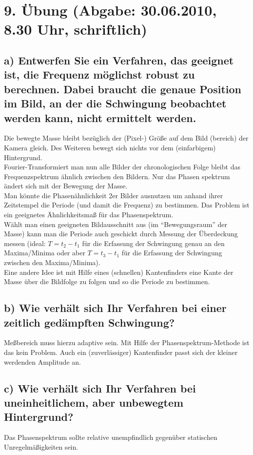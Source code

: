 \section*{9. \"Ubung (Abgabe: 30.06.2010, 8.30 Uhr, schriftlich)}

\subsection*{a) Entwerfen Sie ein Verfahren, das geeignet ist, die Frequenz m\"oglichst robust zu berechnen. Dabei braucht die genaue Position im Bild, an der die Schwingung beobachtet werden kann, nicht ermittelt werden.}
Die bewegte Masse bleibt bez\"uglich der (Pixel-) Gr\"o{\ss}e auf dem Bild (bereich) der Kamera gleich. Des Weiteren bewegt sich nichts vor dem (einfarbigem) Hintergrund. \\
Fourier-Transformiert man nun alle Bilder der chronologischen Folge bleibt das Frequenzspektrum \"ahnlich zwischen den Bildern.
Nur das Phasen spektrum \"andert sich mit der Bewegung der Masse. \\
Man k\"onnte die Phasen\"ahnlichkeit 2er Bilder ausnutzen um anhand ihrer Zeitstempel die Periode (und damit die Frequenz) zu bestimmen. Das Problem ist ein geeignetes \"Ahnlichkeitsma{\ss} f\"ur das Phasenspektrum. \\
W\"ahlt man einen geeigneten Bildausschnitt aus (im ``Bewegungsraum'' der Masse) kann man die Periode auch geschickt durch Messung der \"Uberdeckung messen (ideal: $T=t_2-t_1$ f\"ur die Erfassung der Schwingung genau an den Maxima/Minima oder aber $T=t_3-t_1$ f\"ur die Erfassung der Schwingung zwischen den Maxima/Minima). \\
Eine andere Idee ist mit Hilfe eines (schnellen) Kantenfinders eine Kante der Masse \"uber die Bildfolge zu folgen und so die Periode zu bestimmen. \\

\subsection*{b) Wie verh\"alt sich Ihr Verfahren bei einer zeitlich ged\"ampften Schwingung?}
Me{\ss}bereich muss hierzu adaptive sein.
Mit Hilfe der Phasenspektrum-Methode ist das kein Problem. Auch ein (zuverl\"assiger) Kantenfinder passt sich der kleiner werdenden Amplitude an.

\subsection*{c) Wie verh\"alt sich Ihr Verfahren bei uneinheitlichem, aber unbewegtem Hintergrund?}
Das Phasenspektrum sollte relative unempfindlich gegen\"uber statischen Unregelm\"a{\ss}igkeiten sein.

